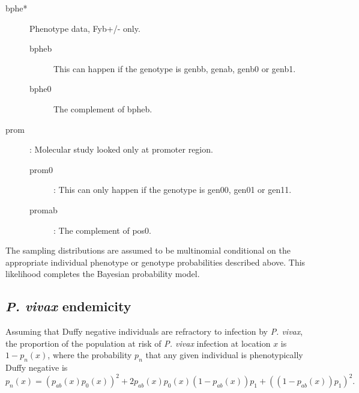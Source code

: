 \begin{description}
\begin{description}
    \end{description}
    \item[bphe*] Phenotype data, Fyb+/- only.
    \begin{description}
        \item[bpheb] This can happen if the genotype is genbb, genab, genb0 or genb1.
        \item[bphe0] The complement of bpheb. 
    \end{description}
    \item[prom]: Molecular study looked only at promoter region.
    \begin{description}
        \item[prom0]: This can only happen if the genotype is gen00, gen01 or gen11.
        \item[promab]: The complement of pos0.
    \end{description}
\end{description}

The sampling distributions are assumed to be multinomial conditional on the appropriate individual phenotype or genotype probabilities described above. This likelihood completes the Bayesian probability model.

\subsection*{\emph{P. vivax} endemicity} 
Assuming that Duffy negative individuals are refractory to infection by \emph{P. vivax}, the proportion of the population at risk of \emph{P. vivax} infection at location $x$ is $1-p_n(x)$, where the probability $p_n$ that any given individual is phenotypically Duffy negative is 
\begin{equation}
    \label{eq:dn-freq} 
    p_n(x)=\left(p_{ab}(x)p_0(x)\right)^2+2p_{ab}(x)p_0(x)(1-p_{ab}(x))p_1+\left((1-p_{ab}(x))p_1\right)^2.
\end{equation}

